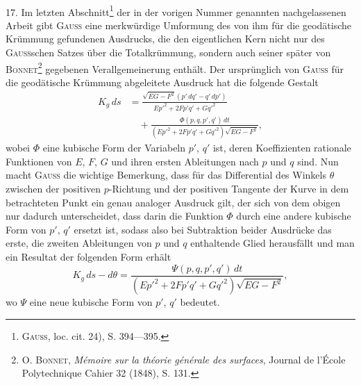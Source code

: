 \clearpage\begingroup\NoSourceHead{}
\renewcommand{\thefootnote}{\arabic{footnote})}\setcounter{footnote}{30}
\begin{center}\\
\end{center}
\noindent\hspace*{\parindent}17. Im letzten Abschnitt\footnote{\textsc{Gauss}, loc. cit. 24), S. 394—395.} der in der vorigen Nummer genannten nachgelassenen Arbeit gibt \textsc{Gauss} eine merkwürdige Umformung des von ihm für
die geodätische Krümmung gefundenen Ausdrucks, die den eigentlichen Kern
nicht nur des \textsc{Gauss}schen Satzes über die Totalkrümmung, sondern auch seiner
später von \textsc{Bonnet}\footnote{O. \textsc{Bonnet}, \textit{Mémoire sur la théorie générale des surfaces}, Journal de l'École Polytechnique
Cahier 32 (1848), S. 131.} gegebenen Verallgemeinerung enthält. Der ursprünglich
von \textsc{Gauss} für die geodätische Krümmung abgeleitete Ausdruck hat die folgende Gestalt
\begin{equation*}\tag{44}
\begin{aligned}
K_g\,ds&=\frac{\sqrt{EG-F^2}(p'\,dq'-q'\,dp')}{Ep'^2+2Fp'q'+Gq'^2}\\
&\quad+\frac{\Phi(p,q,p',q')\,dt}{(Ep'^2+2Fp'q'+Gq'^2)\sqrt{EG-F^2}},
\end{aligned}
\end{equation*}
wobei $\Phi$ eine kubische Form der Variabeln $p'$, $q'$ ist, deren Koeffizienten
rationale Funktionen von $E$, $F$, $G$ und ihren ersten Ableitungen nach $p$ und
$q$ sind. Nun macht \textsc{Gauss} die wichtige Bemerkung, dass für das Differential
des Winkels $\theta$ zwischen der positiven $p$-Richtung und der positiven Tangente
der Kurve in dem betrachteten Punkt ein genau analoger Ausdruck gilt, der
sich von dem obigen nur dadurch unterscheidet, dass darin die Funktion $\Phi$
durch eine andere kubische Form von $p'$, $q'$ ersetzt ist, sodass also bei Subtraktion beider Ausdrücke das erste, die zweiten Ableitungen von $p$ und $q$
enthaltende Glied herausfällt und man ein Resultat der folgenden Form erhält
\begin{equation*}\tag{45}
K_g\,ds-d\theta=\frac{\Psi(p,q,p',q')\,dt}{(Ep'^2+2Fp'q'+Gq'^2)\sqrt{EG-F^2}},
\end{equation*}
wo $\Psi$ eine neue kubische Form von $p'$, $q'$ bedeutet.
